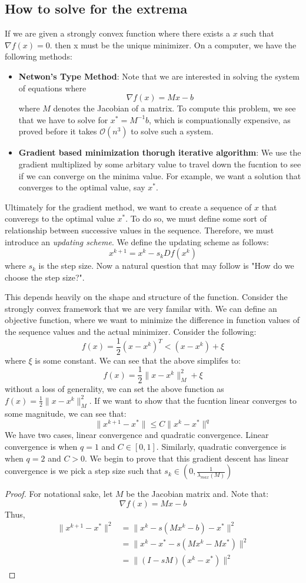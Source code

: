 \documentclass[11pt]{article}
\theoremstyle{definition}
\begin{document}
\subsection{How to solve for the extrema}
If we are given a strongly convex function where there exists a $x$ such that $\nabla f(x) = 0$. then x must be the unique minimizer. On a computer, we have the following methods:
\begin{itemize}
  \item \textbf{Netwon's Type Method}: Note that we are interested in solving the system of equations where \[
  \nabla f(x) = Mx - b
  \]
  where $M$ denotes the Jacobian of a matrix. To compute this problem, we see that we have to solve for $x^* = M^{-1}b$, which is compuationally expensive, as proved before it takes $\mathcal{O}(n^3)$ to solve such a system. 
  \item \textbf{Gradient based minimization thorugh iterative algorithm}: We use the gradient multiplized by some arbitary value to travel down the fucntion to see if we can converge on the minima value. For example, we want a solution that converges to the optimal value, say $x^*$. 
\end{itemize}
Ultimately for the gradient method, we want to create a sequence of $x$ that converegs to the optimal value $x^*$. To do so, we must define some sort of relationship between successive values in the sequence. Therefore, we must introduce an \emph{updating scheme}. We define the updating scheme as follows:
\[
x^{k+1} = x^k - s_k Df(x^k)
\]
where $s_k$ is the step size. Now a natural question that may follow is "How do we choose the step size?". 


This depends heavily on the shape and structure of the function. Consider the strongly convex framework that we are very familar with. We can define an objective function, where we want to minimize the difference in function values of the sequence values and the actual minimizer. Consider the following:
\[
f(x) = \frac{1}{2}(x-x^k)^T < (x - x^k) + \xi 
\]
where $\xi$ is some constant. We can see that the above simplifes to:
\[
f(x) = \frac{1}{2}\|x - x^k\|^2_M + \xi
\]
without a loss of generality, we can set the above function as $f(x) = \frac{1}{2}\|x-x^k\|^2_M$. If we want to show that the fucntion linear converges to some magnitude, we can see that:
\[
\|x^{k+1} - x^*\| \leq C \|x^k - x^*\|^q
\]
We have two cases, linear convergence and quadratic convergence. Linear convergence is when $q = 1$ and $C \in [0,1]$. Similarly, quadratic convergence is when $q = 2$ and $C > 0$. We begin to prove that this gradient descent has linear convergence is we pick a step size such that $s_k \in (0, \frac{1}{\lambda_{max}(M)})$ 
\begin{proof}
  For notational sake, let $M$ be the Jacobian matrix and. Note that:
  \[
  \nabla f(x) = Mx - b
  \]
  Thus, 
  \begin{align*}
    \|x^{k+1} - x^*\|^2 &= \|x^k - s(Mx^k - b) - x^*\|^2\\
    &= \|x^k - x^* -s(Mx^k - Mx^*)\|^2\\
    &= \|(I - sM)(x^k - x^*)\|^2
  \end{align*}
\end{proof}
\end{document}
